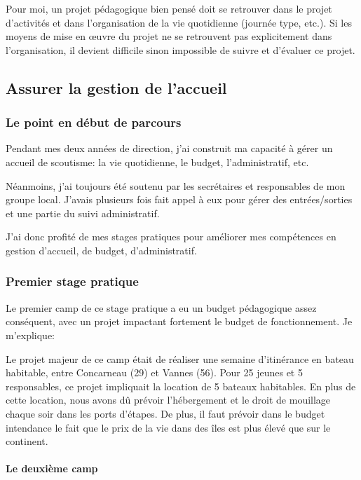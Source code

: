 \documentclass[titlepage,11pt,a4paper]{article}
\begin{document}
Pour moi, un projet pédagogique bien pensé doit se retrouver dans le projet d'activités et
dans l'organisation de la vie quotidienne (journée type, etc.). Si les moyens de mise en
œuvre du projet ne se retrouvent pas explicitement dans l'organisation, il devient
difficile sinon impossible de suivre et d'évaluer ce projet.

\subsection{Assurer la gestion de l'accueil}

\subsubsection{Le point en début de parcours}

Pendant mes deux années de direction, j'ai construit ma capacité à gérer un accueil de
scoutisme: la vie quotidienne, le budget, l'administratif, etc.

Néanmoins, j'ai toujours été soutenu par les secrétaires et responsables de mon groupe
local. J'avais plusieurs fois fait appel à eux pour gérer des entrées/sorties et une
partie du suivi administratif.

J'ai donc profité de mes stages pratiques pour améliorer mes compétences en gestion
d'accueil, de budget, d'administratif.

\subsubsection{Premier stage pratique}

Le premier camp de ce stage pratique a eu un budget pédagogique assez conséquent, avec un
projet impactant fortement le budget de fonctionnement. Je m'explique:

Le projet majeur de ce camp était de réaliser une semaine d'itinérance en bateau
habitable, entre Concarneau (29) et Vannes (56). Pour 25 jeunes et 5 responsables, ce
projet impliquait la location de 5 bateaux habitables. En plus de cette location, nous
avons dû prévoir l'hébergement et le droit de mouillage chaque soir dans les ports d'étapes.
De plus, il faut prévoir dans le budget intendance le fait que le prix de la vie dans des
îles est plus élevé que sur le continent. %

\paragraph{Le deuxième camp}
\end{document}
